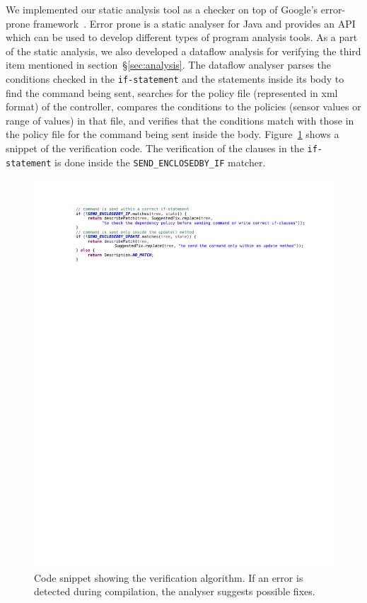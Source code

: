 \documentclass{article}
\begin{document}
We implemented our static analysis tool as a checker on top of Google's error-prone framework~\cite{errorprone}. Error prone is a static analyser for Java and provides an API which can be used to develop different types of program analysis tools. As a part of the static analysis, we also developed a dataflow analysis for verifying the third item mentioned in section~\S\ref{sec:analysis}. The dataflow analyser parses the conditions checked in the \texttt{if-statement} and the statements inside its body to find the command being sent, searches for the policy file (represented in xml format) of the controller, compares the conditions to the policies (sensor values or range of values) in that file, and verifies that the conditions match with those in the policy file for the command being sent inside the body. Figure~\ref{fig:verify1} shows a snippet of the verification code. The verification of the clauses in the \texttt{if-statement} is done inside the \texttt{SEND\_ENCLOSEDBY\_IF} matcher.
\begin{figure}[h]
\begin{center}
\includegraphics[scale=0.7, trim = 0 22cm 0 2cm]{verify1.pdf}
\caption{Code snippet showing the verification algorithm. If an error is detected during compilation, the analyser suggests possible fixes. }
\label{fig:verify1}
\end{center}
\end{figure}
\end{document}
